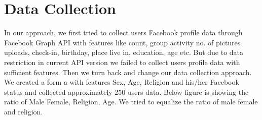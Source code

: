 \documentclass{standalone}
\begin{document}
\section{Data Collection}
In our approach, we first tried to collect users Facebook profile data through Facebook Graph API with features like count, group activity no. of pictures uploads, check-in, birthday, place live in, education, age etc. But due to data restriction in current API version we failed to collect users profile data with sufficient features. Then we turn back and change our data collection approach. We created a form a with features Sex, Age, Religion and his/her Facebook status and collected approximately 250 users data. Below figure is showing the ratio of Male Female, Religion, Age. We tried to equalize the ratio of male female and religion.
\end{document}
